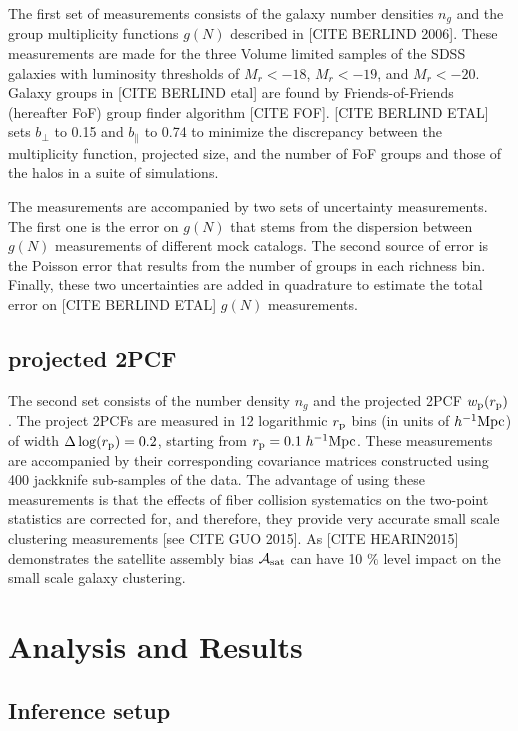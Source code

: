 \documentclass[14pt, preprint]{emulateapj}
\begin{document}
The first set of measurements consists of the galaxy number densities $n_{g}$ and the group multiplicity functions $g(N)$ described in [CITE BERLIND 2006]. These measurements are made 
for the three Volume limited samples of the SDSS galaxies with luminosity thresholds of $M_{r}<-18$, $M_{r}<-19$, and $M_{r}<-20$. Galaxy groups in [CITE BERLIND etal] are found by Friends-of-Friends (hereafter FoF) group finder algorithm [CITE FOF]. [CITE BERLIND ETAL] sets $b_{\perp}$ to 0.15 and $b_{\parallel}$ to 0.74 to minimize the discrepancy between the multiplicity function, projected size, and the number of FoF groups and those of the halos in a suite of simulations.

The measurements are accompanied by two sets of uncertainty measurements. The first one is the error on $g(N)$ that stems from the dispersion between $g(N)$ measurements of different mock catalogs. The second source of error is the Poisson error that results from the number of groups in each richness bin. Finally, these two uncertainties are added in quadrature 
to estimate the total error on [CITE BERLIND ETAL] $g(N)$ measurements.

\subsection{projected 2PCF}

The second set consists of the number density $n_{g}$ and the projected 2PCF $w_{\rm{p}}(r_{\rm{p}})$. The project 2PCFs are measured in 12 logarithmic $r_{\rm p}$ bins (in units of $h^{-1}\rm{Mpc}$) of width $\Delta \log(r_{\rm p}) = 0.2$, starting from $r_{\rm{p}} = 0.1 \; h^{-1}\rm{Mpc}$. These measurements are accompanied by their corresponding covariance matrices constructed using 400 jackknife sub-samples of the data. The advantage of using these measurements is that the effects of fiber collision systematics on the two-point statistics are corrected for, and therefore, they provide very accurate small scale clustering measurements [see CITE GUO 2015]. As [CITE HEARIN2015] demonstrates the satellite assembly bias $\mathcal{A}_{\rm sat}$ can have 10 $\%$ level impact on the small scale galaxy clustering.  

\section{Analysis and Results}

\subsection{Inference setup}
\end{document}
